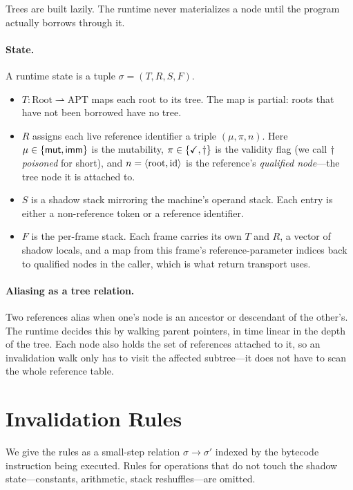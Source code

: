Trees are built lazily. The runtime never materializes a node until
the program actually borrows through it.

\paragraph{State.}
A runtime state is a tuple $\sigma = (T, R, S, F)$.
\begin{itemize}
\item $T : \mathrm{Root} \rightharpoonup \mathrm{APT}$ maps each root
to its tree. The map is partial: roots that have not been borrowed
have no tree.
\item $R$ assigns each live reference identifier a triple $(\mu, \pi,
n)$. Here $\mu \in \{\mathsf{mut}, \mathsf{imm}\}$ is the mutability, $\pi \in
\{\checkmark, \dagger\}$ is the validity flag (we call $\dagger$ \emph{poisoned}
for short), and $n = \langle \mathrm{root}, \mathrm{id} \rangle$ is the
reference's \emph{qualified node}---the tree node it is attached to.
\item $S$ is a shadow stack mirroring the machine's operand stack.
Each entry is either a non-reference token or a reference identifier.
\item $F$ is the per-frame stack. Each frame carries its own $T$ and
$R$, a vector of shadow locals, and a map from this frame's
reference-parameter indices back to qualified nodes in the caller,
which is what return transport uses.
\end{itemize}

\paragraph{Aliasing as a tree relation.}
Two references alias when one's node is an ancestor or descendant of
the other's. The runtime decides this by walking parent pointers, in
time linear in the depth of the tree. Each node also holds the set of
references attached to it, so an invalidation walk only has to visit
the affected subtree---it does not have to scan the whole reference
table.

\section{Invalidation Rules}\label{sec:semantics}

We give the rules as a small-step relation $\sigma \to \sigma'$
indexed by the bytecode instruction being executed. Rules for
operations that do not touch the shadow state---constants,
arithmetic, stack reshuffles---are omitted.

